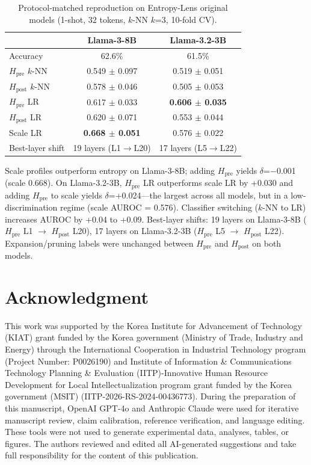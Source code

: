 \documentclass{ieeeaccess}
\newcommand{\Hpre}{H_{\text{pre}}}
\newcommand{\Hpost}{H_{\text{post}}}
\begin{document}
\begin{table}[!ht]
\centering
\caption{Protocol-matched reproduction on Entropy-Lens original models (1-shot, 32 tokens, $k$-NN $k$=3, 10-fold CV).}
\label{tab:el_repro}
\footnotesize
\setlength{\tabcolsep}{3pt}
\begin{tabular}{l cc}
\toprule
 & Llama-3-8B & Llama-3.2-3B \\
\midrule
Accuracy & 62.6\% & 61.5\% \\
$\Hpre$ $k$-NN & 0.549 $\pm$ 0.097 & 0.519 $\pm$ 0.051 \\
$\Hpost$ $k$-NN & 0.578 $\pm$ 0.046 & 0.505 $\pm$ 0.053 \\
$\Hpre$ LR & 0.617 $\pm$ 0.033 & \textbf{0.606 $\pm$ 0.035} \\
$\Hpost$ LR & 0.620 $\pm$ 0.071 & 0.553 $\pm$ 0.044 \\
Scale LR & \textbf{0.668 $\pm$ 0.051} & 0.576 $\pm$ 0.022 \\
Best-layer shift & 19 layers (L1$\to$L20) & 17 layers (L5$\to$L22) \\
\bottomrule
\end{tabular}
\end{table}

Scale profiles outperform entropy on Llama-3-8B; adding $\Hpre$ yields $\delta$=$-$0.001 (scale 0.668). On Llama-3.2-3B, $\Hpre$ LR outperforms scale LR by +0.030 and adding $\Hpre$ to scale yields $\delta$=+0.024---the largest across all models, but in a low-discrimination regime (scale AUROC = 0.576). Classifier switching ($k$-NN to LR) increases AUROC by +0.04 to +0.09. Best-layer shifts: 19 layers on Llama-3-8B ($\Hpre$ L1 $\to$ $\Hpost$ L20), 17 layers on Llama-3.2-3B ($\Hpre$ L5 $\to$ $\Hpost$ L22). Expansion/pruning labels were unchanged between $\Hpre$ and $\Hpost$ on both models.


\FloatBarrier

\section*{Acknowledgment}

This work was supported by the Korea Institute for Advancement of Technology (KIAT) grant funded by the Korea government (Ministry of Trade, Industry and Energy) through the International Cooperation in Industrial Technology program (Project Number: P0026190) and Institute of Information \& Communications Technology Planning \& Evaluation (IITP)-Innovative Human Resource Development for Local Intellectualization program grant funded by the Korea government (MSIT) (IITP-2026-RS-2024-00436773). During the preparation of this manuscript, OpenAI GPT-4o and Anthropic Claude were used for iterative manuscript review, claim calibration, reference verification, and language editing. These tools were not used to generate experimental data, analyses, tables, or figures. The authors reviewed and edited all AI-generated suggestions and take full responsibility for the content of this publication.
\end{document}
